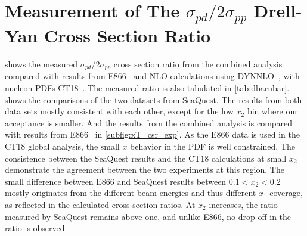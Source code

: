 \documentclass[reprint,aps,unsortedaddress,superscriptaddress,prc,floatfix,showpacs,linenumbers,final]{revtex4-2}
\begin{document}
\section{Measurement of The \texorpdfstring{$\sigma_{pd}/2\sigma_{pp}$}{pd/2pp} Drell-Yan Cross Section Ratio}
\label{sec:csr}
 shows the measured $\sigma_{pd}/2\sigma_{pp}$ cross section ratio from the combined analysis
compared with results from E866~\cite{towell2001} and NLO calculations using DYNNLO~\cite{catani2007,catani2009},
with nucleon PDFs CT18~\cite{hou2021}. The measured ratio is also tabulated in \cref{tab:dbarubar}.
 shows the comparisons of the two datasets from SeaQuest.
The results from both data sets mostly consistent with each other, except for the low $x_2$ bin where our acceptance is smaller. 
And the results from the combined analysis is compared with results from E866~\cite{towell2001} in \cref{subfig:xT_csr_exp}.
As the E866 data is used in the CT18 global analysis, the small $x$ behavior in the PDF is well constrained. 
The consistence between the SeaQuest results and the CT18 calculations at small $x_2$ demonstrate the agreement between
the two experiments at this region.
The small difference between E866 and SeaQuest results between $0.1<x_2<0.2$ mostly originates from the different beam energies
and thus different $x_1$ coverage, as reflected in the calculated cross section ratios. 
At $x_2$ increases, the ratio measured by SeaQuest remains above one, and unlike E866, no drop off in the ratio is observed.
\end{document}
